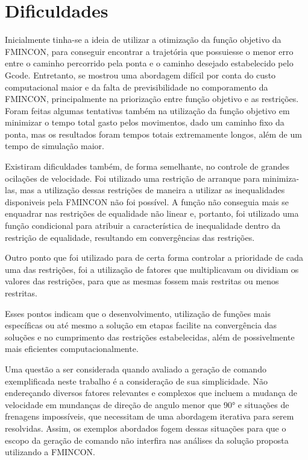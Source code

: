 \section{Dificuldades}
Inicialmente tinha-se a ideia de utilizar a otimização da função objetivo da FMINCON, para conseguir encontrar
a trajetória que possuiesse o menor erro entre o caminho percorrido pela ponta e o caminho desejado estabelecido pelo Gcode.
Entretanto, se mostrou uma abordagem difícil por conta do custo computacional maior e da falta de previsibilidade
no comporamento da FMINCON, principalmente na priorização entre função objetivo e as restrições.
Foram feitas algumas tentativas também na utilização da função objetivo em minimizar o tempo total gasto pelos movimentos, dado
um caminho fixo da ponta, mas os resultados foram tempos totais extremamente longos, além de um tempo de simulação maior.

Existiram dificuldades também, de forma semelhante, no controle de grandes ocilações de velocidade. Foi utilizado
uma restrição de arranque para minimiza-las, mas a utilização dessas restrições de maneira a utilizar as inequalidades
disponiveis pela FMINCON não foi possível. A função não conseguia mais se enquadrar nas restrições de equalidade não linear e,
portanto, foi utilizado uma função condicional para atribuir a característica de inequalidade dentro da restrição de equalidade,
resultando em convergências das restrições.

Outro ponto que foi utilizado para de certa forma controlar a prioridade de cada uma das restrições, foi a utilização
de fatores que multiplicavam ou dividiam os valores das restrições, para que as mesmas fossem mais restritas ou menos restritas.

Esses pontos indicam que o desenvolvimento, utilização de funções mais específicas ou até mesmo a solução em etapas
facilite na convergência das soluções e no cumprimento das restrições estabelecidas, além de possivelmente mais eficientes
computacionalmente.

Uma questão a ser considerada quando avaliado a geração de comando exemplificada neste trabalho é a consideração de sua simplicidade.
Não endereçando diversos fatores relevantes e complexos que incluem a mudança de velocidade em mundanças de direção de angulo menor que 90°
e situações de frenagens impossíveis, que necessitam de uma abordagem iterativa para serem resolvidas.
Assim, os exemplos abordados fogem dessas situações para que o escopo da geração de comando não interfira nas análises da solução
proposta utilizando a FMINCON.

